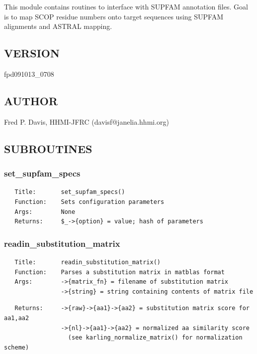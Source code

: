 \documentclass{article}
\begin{document}
This module contains routines to interface with SUPFAM annotation files.
Goal is to map SCOP residue numbers onto target sequences using
SUPFAM alignments and ASTRAL mapping.

\subsection*{VERSION\label{pibase::SUPFAM_pm_VERSION}}


fpd091013\_0708

\subsection*{AUTHOR\label{pibase::SUPFAM_pm_AUTHOR}}


Fred P. Davis, HHMI-JFRC (davisf@janelia.hhmi.org)

\subsection*{SUBROUTINES\label{pibase::SUPFAM_pm_SUBROUTINES}}
\subsubsection*{set\_supfam\_specs\label{pibase::SUPFAM_pm_set_supfam_specs}}
\begin{verbatim}
   Title:       set_supfam_specs()
   Function:    Sets configuration parameters
   Args:        None
   Returns:     $_->{option} = value; hash of parameters
\end{verbatim}
\subsubsection*{readin\_substitution\_matrix\label{pibase::SUPFAM_pm_readin_substitution_matrix}}
\begin{verbatim}
   Title:       readin_substitution_matrix()
   Function:    Parses a substitution matrix in matblas format
   Args:        ->{matrix_fn} = filename of substitution matrix
                ->{string} = string containing contents of matrix file
\end{verbatim}
\begin{verbatim}
   Returns:     ->{raw}->{aa1}->{aa2} = substitution matrix score for aa1,aa2
                ->{nl}->{aa1}->{aa2} = normalized aa similarity score
                  (see karling_normalize_matrix() for normalization scheme)
\end{verbatim}
\end{document}
